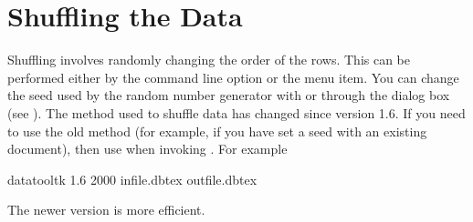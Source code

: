 \section{Shuffling the Data}\label{sec:shuffle}

Shuffling involves randomly changing the order of the rows. This can be
performed either by the  command line option or
the  menu item. You can change
the seed used by the random number generator with
 or through the 
 dialog box (see ).
The method used to shuffle data has changed since version 1.6.
If you need to use the old method (for example, if you
have set a seed with an existing document), then use
 when invoking . For example

\begin{terminal}
datatooltk  1.6  2000  infile.dbtex  outfile.dbtex
\end{terminal}
The newer version is more efficient.


